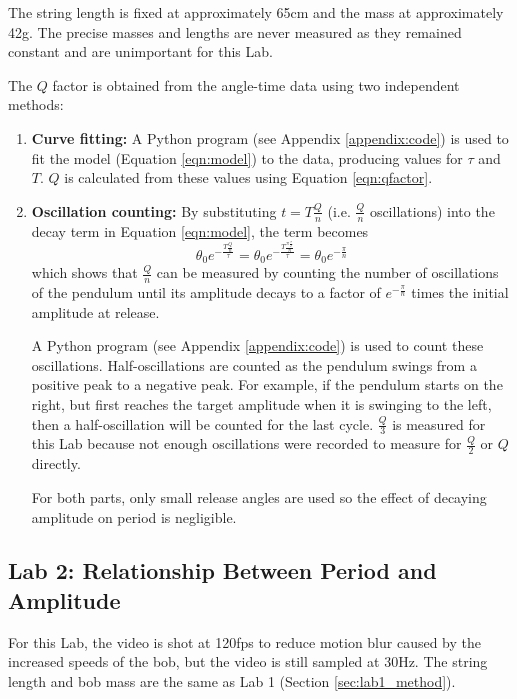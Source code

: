 \documentclass[aps,twocolumn,secnumarabic,nobalancelastpage,amsmath,amssymb,nofootinbib,floatfix,letterpaper]{revtex4}
\begin{document}
The string length is fixed at approximately 65cm and the mass at approximately 42g. The precise masses and lengths are
never measured as they remained constant and are unimportant for this Lab.

The \(Q\) factor is obtained from the angle-time data using two independent methods:
\begin{enumerate}
    \item
        \textbf{Curve fitting:} A Python program (see Appendix \ref{appendix:code}) is used to fit the model (Equation
        \ref{eqn:model}) to the data, producing values for \(\tau\) and \(T\). \(Q\) is calculated from these values
        using Equation \ref{eqn:qfactor}.
    \item
        \textbf{Oscillation counting:} By substituting \(t = T\frac{Q}{n}\) (i.e. \(\frac{Q}{n}\) oscillations) into
        the decay term in Equation \ref{eqn:model}, the term becomes
        \begin{equation}
            \theta_0 e^{-\frac{T\frac{Q}{n}}{\tau}} = \theta_0 e^{-\frac{T\frac{\pi\frac{\tau}{T}}{n}}{\tau}} = \theta_0 e^{-\frac{\pi}{n}}
        \end{equation}
        which shows that \(\frac{Q}{n}\) can be measured by counting the number of oscillations of the pendulum until
        its amplitude decays to a factor of \(e^{-\frac{\pi}{n}}\) times the initial amplitude at release.
        
        A Python program (see Appendix \ref{appendix:code}) is used to count these oscillations. Half-oscillations are
        counted as the pendulum swings from a positive peak to a negative peak. For example, if the pendulum starts on
        the right, but first reaches the target amplitude when it is swinging to the left, then a half-oscillation will
        be counted for the last cycle. \(\frac{Q}{3}\) is measured for this Lab because not enough oscillations were
        recorded to measure for \(\frac{Q}{2}\) or \(Q\) directly.

        For both parts, only small release angles are used so the effect of decaying amplitude on period is negligible.
\end{enumerate}

\subsection{Lab 2: Relationship Between Period and Amplitude}
\label{sec:lab2_method}

For this Lab, the video is shot at 120fps to reduce motion blur caused by the increased speeds of the bob, but the video
is still sampled at 30Hz. The string length and bob mass are the same as Lab 1 (Section \ref{sec:lab1_method}).
\end{document}
